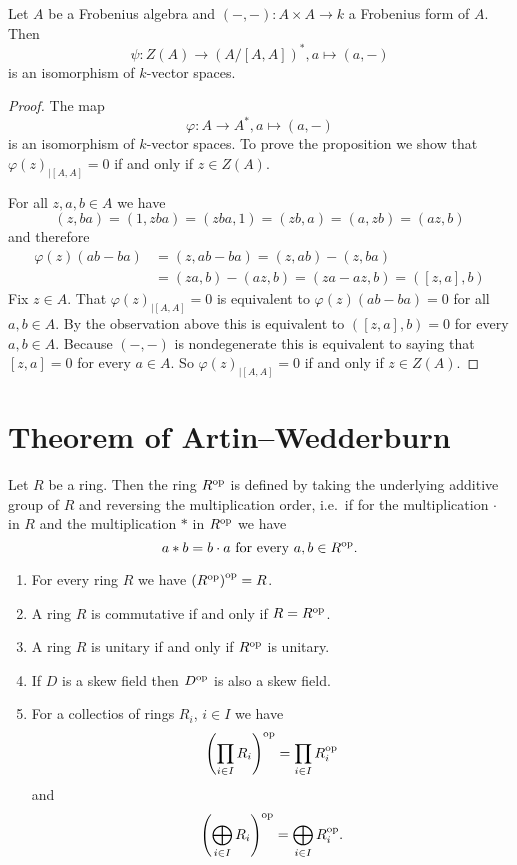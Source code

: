 \begin{prop}
 Let $A$ be a Frobenius algebra and $(-,-) \colon A \times A \to k$ a Frobenius form of $A$. Then
 \[
  \psi \colon Z(A) \to (A/[A,A])^*, a \mapsto (a,-)
 \]
 is an isomorphism of $k$-vector spaces.
\end{prop}
\begin{proof}
 The map
 \[
  \varphi \colon A \to A^*, a \mapsto (a, -)
 \]
 is an isomorphism of $k$-vector spaces. To prove the proposition we show that $\varphi(z)_{|[A,A]} = 0$ if and only if $z \in Z(A)$.
 
 For all $z, a, b \in A$ we have
 \[
  (z,ba) = (1,zba) = (zba,1) = (zb,a) = (a,zb) = (az,b)
 \]
 and therefore
 \begin{align*}
  \varphi(z)(ab-ba)
  &= (z,ab-ba)
  = (z,ab) - (z,ba) \\
  &= (za,b) - (az,b)
  = (za-az,b)
  = ([z,a],b)
 \end{align*}
 Fix $z \in A$. That $\varphi(z)_{|[A,A]} = 0$ is equivalent to $\varphi(z)(ab-ba) = 0$ for all $a,b \in A$. By the observation above this is equivalent to $([z,a],b) = 0$ for every $a,b \in A$. Because $(-,-)$ is nondegenerate this is equivalent to saying that $[z,a] = 0$ for every $a \in A$. So $\varphi(z)_{|[A,A]} = 0$ if and only if $z \in Z(A)$.
\end{proof}





\section{Theorem of Artin--Wedderburn}


\begin{defi}
 Let $R$ be a ring. Then the ring $R^{\mathrm{op}}$ is defined by taking the underlying additive group of $R$ and reversing the multiplication order, i.e.\ if for the multiplication $\cdot$ in $R$ and the multiplication $*$ in $R^{\mathrm{op}}$ we have
 \[
  a * b = b \cdot a \text{ for every } a,b \in R^{\mathrm{op}}.
 \]
\end{defi}


\begin{rem}
 \begin{enumerate}[label=\emph{\alph*)}]
  \item
   For every ring $R$ we have $\left( R^{\mathrm{op}} \right)^{\mathrm{op}} = R$.
  \item
   A ring $R$ is commutative if and only if $R = R^{\mathrm{op}}$.
  \item
   A ring $R$ is unitary if and only if $R^{\mathrm{op}}$ is unitary.
  \item
   If $D$ is a skew field then $D^{\mathrm{op}}$ is also a skew field.
  \item
   For a collectios of rings $R_i$, $i \in I$ we have
   \[
    \left( \prod_{i \in I} R_i \right)^{\mathrm{op}} = \prod_{i \in I} R_i^{\mathrm{op}}
   \]
   and
   \[
    \left( \bigoplus_{i \in I} R_i \right)^{\mathrm{op}} = \bigoplus_{i \in I} R_i^{\mathrm{op}}.
   \]
 \end{enumerate}
\end{rem}


